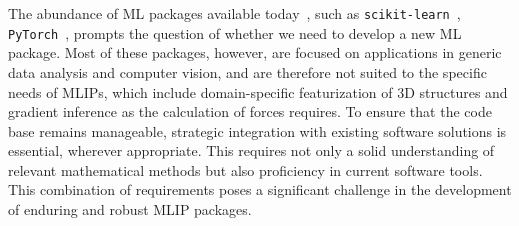 The abundance of ML packages available today~\cite{Haddad2023Artificial}, such as \texttt{scikit-learn}~\cite{pedregosa2011scikit}, \texttt{PyTorch}~\cite{NEURIPS2019_9015}, prompts the question of whether we need to develop a new ML package.
Most of these packages, however, are focused on applications in generic data analysis and computer vision, and are therefore not suited to the specific needs of MLIPs, which include domain-specific featurization of 3D structures and gradient inference as the calculation of forces requires. %
To ensure that the code base remains manageable, strategic integration with existing software solutions is essential, wherever appropriate.
This requires not only a solid understanding of relevant mathematical methods but also proficiency in current software tools.
This combination of requirements poses a significant challenge in the development of enduring and robust MLIP packages.

